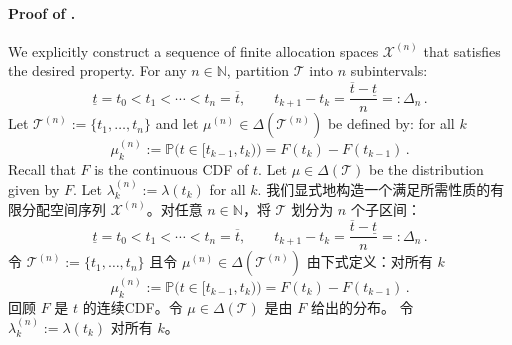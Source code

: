 \documentclass[12pt,letterpaper]{article}
\newenvironment{original}{\color{black}\noindent}{}
\newenvironment{translation}{\color{blue}\noindent}{}
\theoremstyle{plain}
\theoremstyle{definition}
\theoremstyle{remark}
\renewcommand{\P}{\mathds{P}}
\newcommand{\N}{\mathds{N}}
\renewcommand{\1}{\mathds{1}}
\newcommand{\X}{\mathcal{X}}
\theoremstyle{definition}
\begin{document}
\paragraph{Proof of .}\hspace{-2mm}\begin{original}We explicitly construct a sequence of finite allocation spaces $\X^{(n)}$ that satisfies the desired property. For any $n \in \N$, partition $\mathcal{T}$ into $n$  subintervals:
\[
\underline{t}=t_0<t_1<\cdots<t_{n}=\overline{t},\qquad t_{k+1}-t_k=\frac{\overline{t} - \underline{t}}{n} =: \Delta_n\,.
\]
Let $\mathcal{T}^{(n)} := \{t_1,\dots,t_n\}$ and let $\mu^{(n)} \in \Delta(\mathcal{T}^{(n)})$ be defined by: for all $k$
\[
\mu^{(n)}_k := \P\big(t \in [t_{k-1}, t_{k}) \big)=F(t_{k})-F(t_{k-1})\,.
\]
Recall that $F$ is the continuous CDF of $t$. Let $\mu \in \Delta(\mathcal{T})$ be the distribution given by $F$.  Let $\lambda_k^{(n)}:=\lambda(t_k)$ for all $k$.
\end{original}
\begin{translation}
我们显式地构造一个满足所需性质的有限分配空间序列 $\X^{(n)}$。对任意 $n \in \N$，将 $\mathcal{T}$ 划分为 $n$ 个子区间：
\[
\underline{t}=t_0<t_1<\cdots<t_{n}=\overline{t},\qquad t_{k+1}-t_k=\frac{\overline{t} - \underline{t}}{n} =: \Delta_n\,.
\]
令 $\mathcal{T}^{(n)} := \{t_1,\dots,t_n\}$ 且令 $\mu^{(n)} \in \Delta(\mathcal{T}^{(n)})$ 由下式定义：对所有 $k$
\[
\mu^{(n)}_k := \P\big(t \in [t_{k-1}, t_{k}) \big)=F(t_{k})-F(t_{k-1})\,.
\]
回顾 $F$ 是 $t$ 的连续CDF。令 $\mu \in \Delta(\mathcal{T})$ 是由 $F$ 给出的分布。 令 $\lambda_k^{(n)}:=\lambda(t_k)$ 对所有 $k$。
\end{translation}
\end{document}
